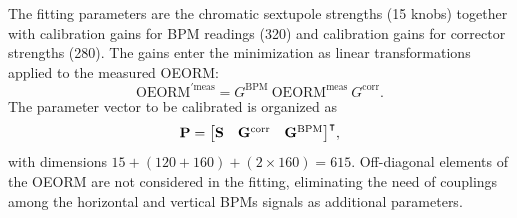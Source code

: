 \documentclass[%
               ]{jacow}
\begin{document}
The fitting parameters are the chromatic sextupole strengths (15 knobs) together with calibration gains for BPM readings (320) and calibration gains for corrector strengths (280). The gains enter the minimization as linear transformations applied to the measured OEORM:
\begin{equation}
    \text{OEORM}^{\prime\text{meas}} =  G^\text{BPM}~\text{OEORM}^{\text{meas}}~G^{\text{corr}}.
\end{equation}
The parameter vector to be calibrated is organized as
$$\vb{P} = \mqty[\vb{S} & \vb{G}^{\text{corr}} & \vb{G}^{\text{BPM}}]^\intercal,$$
with dimensions $15 + (120 + 160) + (2\times 160) =  615$. 
Off-diagonal elements of the OEORM are not considered in the fitting, eliminating the need of couplings among the horizontal and vertical BPMs signals as additional parameters. 
\end{document}
